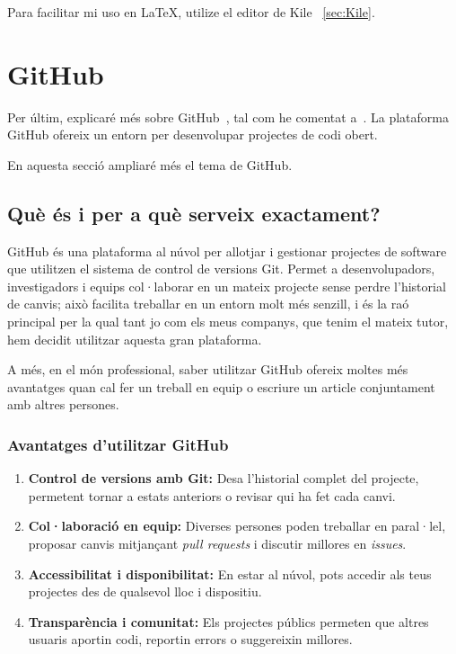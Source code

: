 Para facilitar mi uso en LaTeX, utilize el editor de Kile ~\ref{sec:Kile}.

\section{GitHub}
Per últim, explicaré més sobre GitHub~\cite{GitHub}, tal com he comentat a~. La plataforma GitHub ofereix un entorn per desenvolupar projectes de codi obert.

En aquesta secció ampliaré més el tema de GitHub.

\subsection{Què és i per a què serveix exactament?}
GitHub és una plataforma al núvol per allotjar i gestionar projectes de software que utilitzen el sistema de control de versions Git. Permet a desenvolupadors, investigadors i equips col·laborar en un mateix projecte sense perdre l’historial de canvis; això facilita treballar en un entorn molt més senzill, i és la raó principal per la qual tant jo com els meus companys, que tenim el mateix tutor, hem decidit utilitzar aquesta gran plataforma.

A més, en el món professional, saber utilitzar GitHub ofereix moltes més avantatges quan cal fer un treball en equip o escriure un article conjuntament amb altres persones.

\subsubsection{Avantatges d’utilitzar GitHub}
\begin{enumerate}
 \item \textbf{Control de versions amb Git:} Desa l’historial complet del projecte, permetent tornar a estats anteriors o revisar qui ha fet cada canvi.
 \item \textbf{Col·laboració en equip:} Diverses persones poden treballar en paral·lel, proposar canvis mitjançant \textit{pull requests} i discutir millores en \textit{issues}.
 \item \textbf{Accessibilitat i disponibilitat:} En estar al núvol, pots accedir als teus projectes des de qualsevol lloc i dispositiu.
 \item \textbf{Transparència i comunitat:} Els projectes públics permeten que altres usuaris aportin codi, reportin errors o suggereixin millores.
\end{enumerate}

